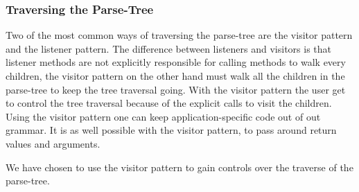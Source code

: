 
\subsubsection*{Traversing the Parse-Tree}
Two of the most common ways of traversing the parse-tree are the visitor pattern and the listener pattern. 
The difference between listeners and visitors is that listener methods are not explicitly responsible for calling methods to walk every children, the visitor pattern on the other hand must walk all the children in the parse-tree to keep the tree traversal going.
With the visitor pattern the user get to control the tree traversal because of the explicit calls to visit the children. \citep{ANTLR4_Book}
Using the visitor pattern one can keep application-specific code out of out grammar.
It is as well possible with the visitor pattern, to pass around return values and arguments.

We have chosen to use the visitor pattern to gain controls over the traverse of the parse-tree. 




